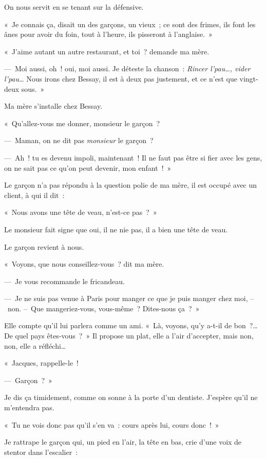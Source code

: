 \documentclass[french,twoside]{book} %
\begin{document}
On nous servit en se tenant sur la défensive.\par
« Je connais ça, disait un des garçons, un vieux ; ce sont des frimes, ils font les ânes pour avoir du foin, tout à l’heure, ils pisseront à l’anglaise. »\par
« J’aime autant un autre restaurant, et toi ? demande ma mère.\par
— Moi aussi, oh ! oui, moi aussi. Je déteste la chanson : \emph{Rincer l’pau…, vider l’pau…} Nous irons chez Bessay, il est à deux pas justement, et ce n’est que vingt-deux sous. »\par
Ma mère s’installe chez Bessay.\par
« Qu’allez-vous me donner, monsieur le garçon ?\par
— Maman, on ne dit pas \emph{monsieur} le garçon ?\par
— Ah ! tu es devenu impoli, maintenant ! Il ne faut pas être si fier avec les gens, on ne sait pas ce qu’on peut devenir, mon enfant ! »\par
Le garçon n’a pas répondu à la question polie de ma mère, il est occupé avec un client, à qui il dit :\par
« Nous avons une tête de veau, n’est-ce pas ? »\par
Le monsieur fait signe que oui, il ne nie pas, il a bien une tête de veau.\par
\bigbreak
\noindent Le garçon revient à nous.\par
« Voyons, que nous conseillez-vous ? dit ma mère.\par
— Je vous recommande le fricandeau.\par
— Je ne suis pas venue à Paris pour manger ce que je puis manger chez moi, – non. – Que mangeriez-vous, vous-même ? Dites-nous ça ? »\par
Elle compte qu’il lui parlera comme un ami. « Là, voyons, qu’y a-t-il de bon ?… De quel pays êtes-vous ? » Il propose un plat, elle a l’air d’accepter, mais non, non, elle a réfléchi…\par
« Jacques, rappelle-le !\par
— Garçon ? »\par
Je dis ça timidement, comme on sonne à la porte d’un dentiste. J’espère qu’il ne m’entendra pas.\par
« Tu ne vois donc pas qu’il s’en va : cours après lui, cours donc ! »\par
Je rattrape le garçon qui, un pied en l’air, la tête en bas, crie d’une voix de stentor dans l’escalier :\par
\end{document}
